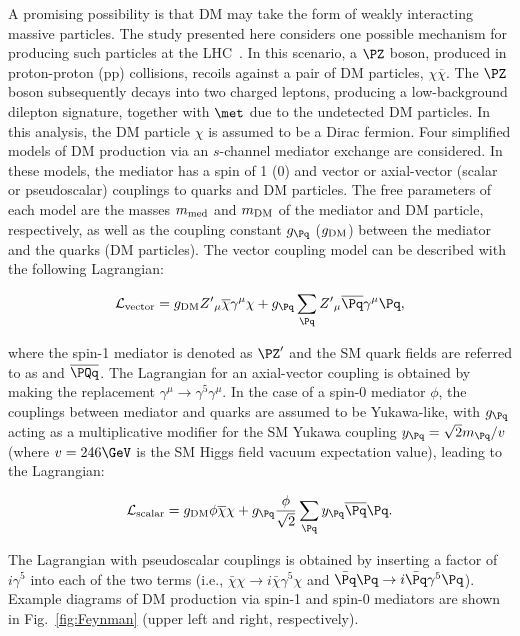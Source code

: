 A promising possibility is that DM may take the form of weakly interacting massive particles.
The study presented here considers one possible mechanism for producing such particles at the LHC~\cite{Abercrombie:2015wmb}.
In this scenario, a $\PZ$ boson, produced in proton-proton (pp) collisions, recoils against a pair of DM particles, $\chi\overline\chi$. The $\PZ$ boson subsequently decays into
two charged leptons, producing a low-background dilepton signature, together with $\met$
due to the undetected DM particles. In this analysis, the DM particle $\chi$ is assumed to be a Dirac fermion.
Four simplified models of DM production via an $s$-channel mediator exchange are considered.
In these models, the mediator has a spin of 1 (0) and vector or axial-vector (scalar or pseudoscalar) couplings to quarks and DM particles.
The free parameters of each model are the masses $m_{\rm med}$ and $m_{\rm DM}$ of the mediator and DM particle, respectively, as well as the coupling
constant $g_{\Pq}$ ($g_{\rm DM}$) between the mediator and the quarks (DM particles).
The vector coupling model can be described with the following Lagrangian:

\begin{equation*}
\mathcal{L}_{\text{vector}} = g_{\rm DM} {Z'}_{\mu}\overline{\chi}\gamma^{\mu}\chi  + g_{\Pq} \sum_{\Pq} {Z'}_{\mu} \overline{\Pq}\gamma^{\mu}\Pq,
\end{equation*}

\noindent where the spin-1 mediator is denoted as $\PZ'$ and the SM quark fields are referred to as \PQq and $\overline{\PQq}$.
The Lagrangian for an axial-vector coupling is obtained by making the replacement $\gamma^\mu\rightarrow\gamma^5\gamma^\mu$.
In the case of a spin-0 mediator $\phi$, the couplings between mediator and quarks are assumed to be Yukawa-like, with $g_{\Pq}$ acting as a 
multiplicative modifier for the SM Yukawa coupling ${y_{\Pq} = \sqrt{2}m_{\Pq}/v}$ (where $v = 246 \GeV$ is the SM Higgs field vacuum expectation value),
leading to the Lagrangian:

\begin{equation*}
\mathcal{L}_{\text{scalar}} = g_{\rm DM} {\phi}\overline{\chi}\chi  + g_{\Pq} \frac{\phi}{\sqrt{2}}\sum_{\Pq} y_{\Pq} \overline{\Pq}\Pq.
\end{equation*}

\noindent The Lagrangian with pseudoscalar couplings is obtained by inserting a factor of $i\gamma^5$ into each of the two terms (i.e., $\bar\chi\chi \to i\bar\chi\gamma^5\chi$ and $\bar \Pq \Pq \to i\bar \Pq\gamma^5 \Pq$). Example diagrams of DM production via spin-1 and spin-0 mediators are shown in Fig.~\ref{fig:Feynman} (upper left and right, respectively).

